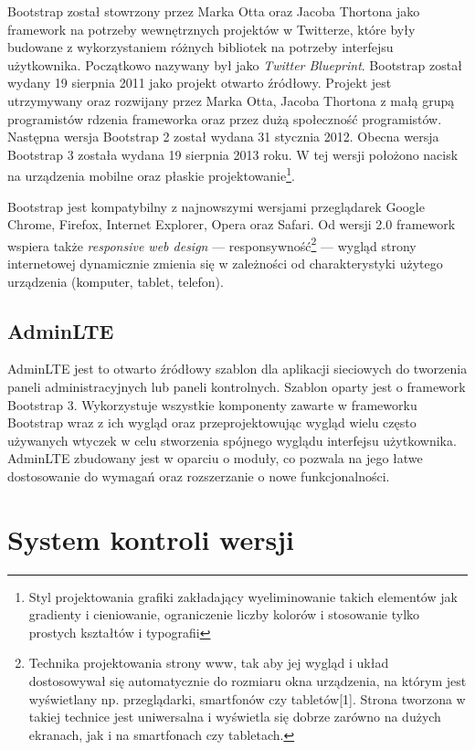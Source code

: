 Bootstrap został stowrzony przez Marka Otta oraz Jacoba Thortona jako framework na potrzeby wewnętrznych projektów w Twitterze, które były budowane z wykorzystaniem różnych bibliotek na potrzeby interfejsu użytkownika. Początkowo nazywany był jako \emph{Twitter Blueprint}. Bootstrap został wydany 19 sierpnia 2011 jako projekt otwarto źródłowy. Projekt jest utrzymywany oraz rozwijany przez Marka Otta, Jacoba Thortona z małą grupą programistów rdzenia frameworka oraz przez dużą społeczność programistów. Następna wersja Bootstrap 2 został wydana 31 stycznia 2012. Obecna wersja Bootstrap 3 została wydana 19 sierpnia 2013 roku. W tej wersji położono nacisk na urządzenia mobilne oraz płaskie projektowanie\footnote{Styl projektowania grafiki zakładający wyeliminowanie takich elementów jak gradienty i cieniowanie, ograniczenie liczby kolorów i stosowanie tylko prostych kształtów i typografii}\cite{bsWiki}.

Bootstrap jest kompatybilny z najnowszymi wersjami przeglądarek Google Chrome, Firefox, Internet Explorer, Opera oraz Safari. Od wersji 2.0 framework wspiera także \emph{responsive web design} --- responsywność\footnote{Technika projektowania strony www, tak aby jej wygląd i układ dostosowywał się automatycznie do rozmiaru okna urządzenia, na którym jest wyświetlany np. przeglądarki, smartfonów czy tabletów[1]. Strona tworzona w takiej technice jest uniwersalna i wyświetla się dobrze zarówno na dużych ekranach, jak i na smartfonach czy tabletach.} --- wygląd strony internetowej dynamicznie zmienia się w zależności od charakterystyki użytego urządzenia (komputer, tablet, telefon).

\subsection{AdminLTE}

AdminLTE jest to otwarto źródłowy szablon dla aplikacji sieciowych do tworzenia paneli administracyjnych lub paneli kontrolnych. Szablon oparty jest o framework Bootstrap 3. Wykorzystuje wszystkie komponenty zawarte w frameworku Bootstrap wraz z ich wygląd oraz przeprojektowując wygląd wielu często używanych wtyczek w celu stworzenia spójnego wyglądu interfejsu użytkownika. AdminLTE zbudowany jest w oparciu o moduły, co pozwala na jego łatwe dostosowanie do wymagań oraz rozszerzanie o nowe funkcjonalności.

\section{System kontroli wersji}

